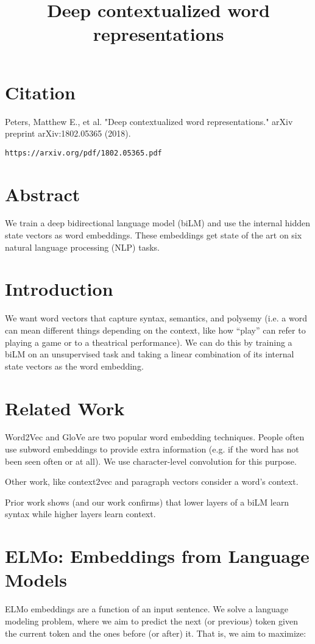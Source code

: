 \documentclass[a4paper]{article}
\title{Deep contextualized word representations}
\date{}
\begin{document}
\maketitle

\section{Citation}
Peters, Matthew E., et al. "Deep contextualized word representations." arXiv preprint arXiv:1802.05365 (2018).

\begin{verbatim}
https://arxiv.org/pdf/1802.05365.pdf
\end{verbatim}

\section{Abstract}
We train a deep bidirectional language model (biLM) and use the internal
hidden state vectors as word embeddings. These embeddings get state of the art
on six natural language processing (NLP) tasks.

\section{Introduction}
We want word vectors that capture syntax, semantics, and polysemy (i.e. a
word can mean different things depending on the context, like how ``play''
can refer to playing a game or to a theatrical performance). We can do this by training
a biLM on an unsupervised task and taking a linear combination of its internal
state vectors as the word embedding.

\section{Related Work}
Word2Vec and GloVe are two popular word embedding techniques. People often use
subword embeddings to provide extra information (e.g. if the word has not been
seen often or at all). We use character-level convolution for this purpose.

Other work, like context2vec and paragraph vectors consider a word's context.

Prior work shows (and our work confirms) that lower layers of a biLM learn
syntax while higher layers learn context.

\section{ELMo: Embeddings from Language Models}
ELMo embeddings are a function of an input sentence. We solve a language
modeling problem, where we aim to predict the next (or previous) token
given the current token and the ones before (or after) it. That is, we aim
to maximize:
\end{document}
